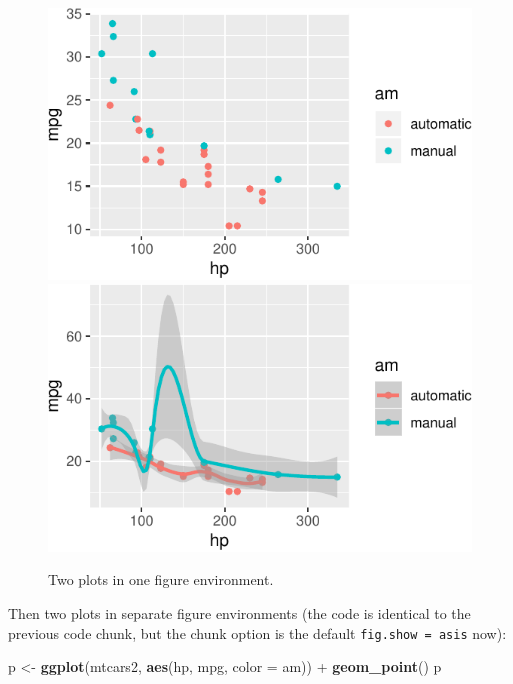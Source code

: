 \documentclass[]{tufte-handout}
\newenvironment{Shaded}{}{}
\newcommand{\KeywordTok}[1]{\textcolor[rgb]{0.00,0.44,0.13}{\textbf{#1}}}
\newcommand{\DataTypeTok}[1]{\textcolor[rgb]{0.56,0.13,0.00}{#1}}
\newcommand{\StringTok}[1]{\textcolor[rgb]{0.25,0.44,0.63}{#1}}
\newcommand{\OperatorTok}[1]{\textcolor[rgb]{0.40,0.40,0.40}{#1}}
\newcommand{\NormalTok}[1]{#1}
\begin{document}
\begin{figure}
\includegraphics{handout-twitter-analysis_files/figure-latex/fig-two-together-1} \includegraphics{handout-twitter-analysis_files/figure-latex/fig-two-together-2} \caption[Two plots in one figure environment]{Two plots in one figure environment.}\label{fig:fig-two-together}
\end{figure}

Then two plots in separate figure environments (the code is identical to
the previous code chunk, but the chunk option is the default
\texttt{fig.show\ =\ \textquotesingle{}asis\textquotesingle{}} now):

\begin{Shaded}
\begin{Highlighting}[]
\NormalTok{p <-}\StringTok{ }\KeywordTok{ggplot}\NormalTok{(mtcars2, }\KeywordTok{aes}\NormalTok{(hp, mpg, }\DataTypeTok{color =}\NormalTok{ am)) }\OperatorTok{+}
\StringTok{  }\KeywordTok{geom_point}\NormalTok{()}
\NormalTok{p}
\end{Highlighting}
\end{Shaded}
\end{document}
